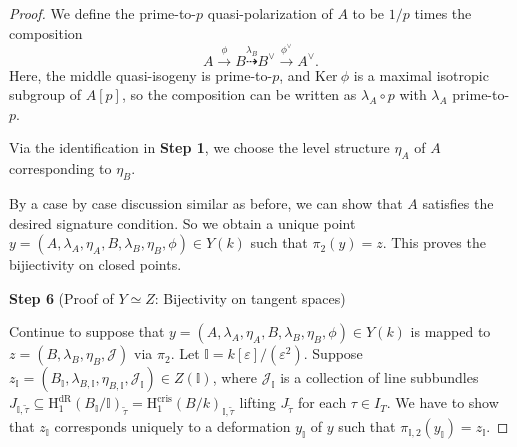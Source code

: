 \documentclass{article}
\begin{document}
\begin{proof}
We define the prime-to-$p$ quasi-polarization of $A$ to be $1/p$ times the composition
\begin{equation}
A\xrightarrow{\phi}B\stackrel{\lambda_B}{\dashrightarrow}B^\vee \xrightarrow{\phi^\vee} A^\vee.
\end{equation}
Here, the middle quasi-isogeny is prime-to-$p$, and $\text{Ker}\ \phi$ is a maximal isotropic subgroup of $A[p]$, so the composition can be written as $\lambda_A\circ p$ with $\lambda_A$ prime-to-$p$.

Via the identification in \textbf{Step 1}, we choose the level structure $\eta_A$ of $A$ corresponding to $\eta_B$.

By a case by case discussion similar as before, we can show that $A$ satisfies the desired signature condition. So we obtain a unique point $y=(A,\lambda_A,\eta_A,B,\lambda_B,\eta_B,\phi)\in Y(k)$ such that $\pi_2(y)=z$. This proves the bijiectivity on closed points.



\medskip
\noindent
\textbf{Step 6} (Proof of $Y\simeq Z$: Bijectivity on tangent spaces)

Continue to suppose that $y=(A,\lambda_A,\eta_A,B,\lambda_B,\eta_B,\phi)\in Y(k)$ is mapped to $z=(B,\lambda_B,\eta_B,\mathcal{J})$ via $\pi_2$. Let $\mathbb{I}=k[\varepsilon]/(\varepsilon^2)$. Suppose $z_{\mathbb{I}}=(B_{\mathbb{I}},\lambda_{B,\mathbb{I}},\eta_{B,\mathbb{I}},\mathcal{J}_{\mathbb{I}})\in Z(\mathbb{I})$, where $\mathcal{J}_{\mathbb{I}}$ is a collection of line subbundles $J_{\mathbb{I},\tilde\tau}\subseteq \text{H}_1^{\text{dR}}(B_{\mathbb{I}}/\mathbb{I})_{\tilde\tau}=\text{H}_1^{\text{cris}}(B/k)_{\mathbb{I},\tilde\tau}$ lifting $J_{\tilde\tau}$ for each $\tau\in I_T$. We have to show that $z_{\mathbb{I}}$ corresponds uniquely to a deformation $y_{\mathbb{I}}$ of $y$ such that $\pi_{\mathbb{I},2}(y_{\mathbb{I}})=z_{\mathbb{I}}$.


\end{proof}
\end{document}
